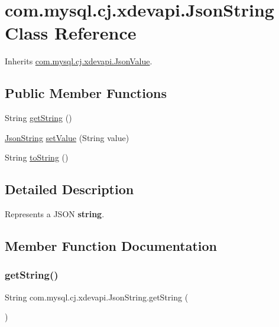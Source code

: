 \hypertarget{classcom_1_1mysql_1_1cj_1_1xdevapi_1_1_json_string}{}\section{com.\+mysql.\+cj.\+xdevapi.\+Json\+String Class Reference}
\label{classcom_1_1mysql_1_1cj_1_1xdevapi_1_1_json_string}


Inherits \mbox{\hyperlink{interfacecom_1_1mysql_1_1cj_1_1xdevapi_1_1_json_value}{com.\+mysql.\+cj.\+xdevapi.\+Json\+Value}}.

\subsection*{Public Member Functions}
\begin{DoxyCompactItemize}
\item 
String \mbox{\hyperlink{classcom_1_1mysql_1_1cj_1_1xdevapi_1_1_json_string_a39f1efefab35b1c29d67b653fd697851}{get\+String}} ()
\item 
\mbox{\hyperlink{classcom_1_1mysql_1_1cj_1_1xdevapi_1_1_json_string}{Json\+String}} \mbox{\hyperlink{classcom_1_1mysql_1_1cj_1_1xdevapi_1_1_json_string_a158d7795014b0fa7286f8094e5226458}{set\+Value}} (String value)
\item 
String \mbox{\hyperlink{classcom_1_1mysql_1_1cj_1_1xdevapi_1_1_json_string_a776cb9769c5d6d3c28ba12115b8898c9}{to\+String}} ()
\end{DoxyCompactItemize}


\subsection{Detailed Description}
Represents a J\+S\+ON {\bfseries string}. 

\subsection{Member Function Documentation}
\mbox{\label{classcom_1_1mysql_1_1cj_1_1xdevapi_1_1_json_string_a39f1efefab35b1c29d67b653fd697851}} 
\subsubsection{\texorpdfstring{get\+String()}{getString()}}
{\footnotesize\ttfamily String com.\+mysql.\+cj.\+xdevapi.\+Json\+String.\+get\+String (\begin{DoxyParamCaption}{ }\end{DoxyParamCaption})}

